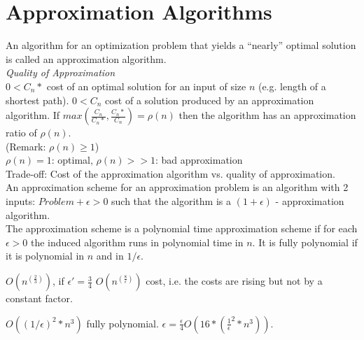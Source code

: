 \chapter{Approximation Algorithms}
An algorithm for an optimization problem that yields a ``nearly''
optimal solution is called an approximation algorithm.\\
\emph{Quality of Approximation}\\
$0<C_{n}*$ cost of an optimal solution for an input of size
$n$ (e.g. length of a shortest path). $0<C_{n}$ cost of a solution
produced by an approximation algorithm. If 
$max(\frac{C_{n}}{C_{n}*},\frac{C_{n}*}{C_{n}})=\rho (n)$ then
the algorithm has an approximation ratio of $\rho (n)$.\\
(Remark: $\rho (n) \ge 1$)\\
$\rho (n) = 1$: optimal, $\rho(n) >> 1$: bad approximation\\
Trade-off: Cost of the approximation algorithm vs. quality of approximation.\\
An approximation scheme for an approximation problem is an 
algorithm with 2 inputs: $Problem + \epsilon>0$ such that
the algorithm is a $(1 + \epsilon)$ - approximation algorithm.\\
The approximation scheme is a polynomial time approximation
scheme if for each $\epsilon > 0$ the induced algorithm runs in polynomial time in $n$.
It is fully polynomial if it is polynomial in $n$ and in $1/\epsilon$.
\begin{example}
$O(n^(\frac{2}{3}))$, if $\epsilon' = \frac{3}{4}$ $O(n^(\frac{8}{\epsilon}))$ cost, i.e.
the costs are rising but not by a constant factor.
\end{example}
\begin{example}
$O((1/\epsilon)^2 * n^3)$ fully polynomial. $\epsilon = \frac{\epsilon}{4}
O(16*(\frac{1}{\epsilon}^2 * n^3))$.
\end{example}
